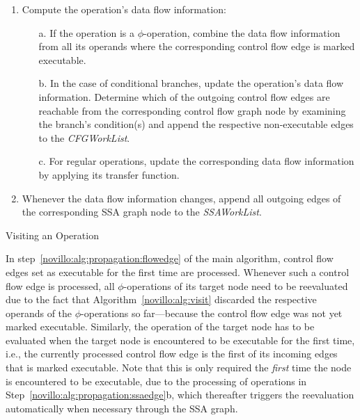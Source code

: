 \begin{algorithm}[t!]
  \begin{enumerate}
    \item Compute the operation's data flow information:
    \begin{enumerate}
      \vspace{-1.2ex}
      \item[a.] \label{novillo:alg:visit:phi} If the operation is a
                $\phi$-operation, combine the data flow information from all its
                operands where the corresponding control flow edge is marked 
                executable.
      \item[b.] \label{novillo:alg:visit:branch} In the case of conditional
                branches, update the operation's data flow information. Determine
                which of the outgoing control flow edges are reachable from the
                corresponding control flow graph node by examining the branch's
                condition(s) and append the respective non-executable edges to
                the \emph{CFGWorkList}.
      \item[c.] \label{novillo:alg:visit:regular} For regular operations, update
                the corresponding data flow information by applying its transfer
                function.
    \end{enumerate}
    \vspace{-1ex}
    \item Whenever the data flow information changes, append all outgoing edges
          of the corresponding SSA graph node to the \emph{SSAWorkList}.
  \end{enumerate}
  \caption{Visiting an Operation}
  \label{novillo:alg:visit}
\end{algorithm}

In step~\ref{novillo:alg:propagation:flowedge} of the main algorithm, control
flow edges set as executable for the first time are processed.
Whenever such a control flow edge is processed, all
$\phi$-operations of its target node need to be reevaluated due to the fact that
Algorithm~\ref{novillo:alg:visit} discarded the respective operands of the
$\phi$-operations so far---because the control flow edge was not yet marked
executable.
Similarly, the operation of the target node has to be evaluated when the target
node is encountered to be executable for the first time, i.e., the currently
processed control flow edge is the first of its incoming edges that is marked
executable. Note that this is only required the \emph{first} time the node is
encountered to be executable, due to the processing of operations in
Step~\ref{novillo:alg:propagation:ssaedge}b, which thereafter triggers the
reevaluation automatically when necessary through the SSA graph.

